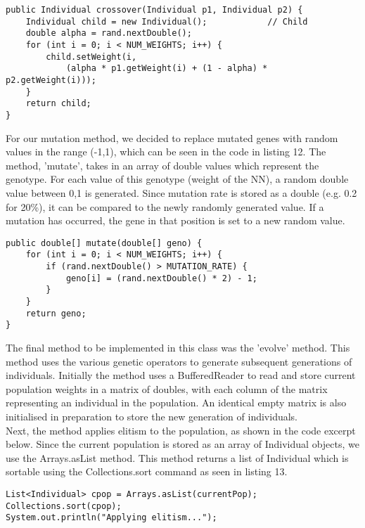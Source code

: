 \documentclass[12pt,a4paper]{article}
\begin{document}
\singlespacing
\begin{lstlisting}[caption=Weight based crossover implementation]
public Individual crossover(Individual p1, Individual p2) {
	Individual child = new Individual();            // Child
	double alpha = rand.nextDouble();
	for (int i = 0; i < NUM_WEIGHTS; i++) {
		child.setWeight(i,
			(alpha * p1.getWeight(i) + (1 - alpha) * p2.getWeight(i)));
	}
	return child;
}
\end{lstlisting}
\onehalfspace

\newpage
For our mutation method, we decided to replace mutated genes with random values in the range (-1,1), which can be seen in the code in listing 12. The method, 'mutate', takes in an array of double values which represent the genotype. For each value of this genotype (weight of the NN), a random double value between 0,1 is generated. Since mutation rate is stored as a double (e.g. 0.2 for 20\%), it can be compared to the newly randomly generated value. If a mutation has occurred, the gene in that position is set to a new random value.

\singlespacing
\begin{lstlisting}[caption=Code for mutation genetic operator in GeneticAlgorithm class]
public double[] mutate(double[] geno) {
	for (int i = 0; i < NUM_WEIGHTS; i++) {
		if (rand.nextDouble() > MUTATION_RATE) {
			geno[i] = (rand.nextDouble() * 2) - 1;
		}
	}
	return geno;
}
\end{lstlisting}
\onehalfspace
\vspace{7mm}

The final method to be implemented in this class was the 'evolve' method. This method uses the various genetic operators to generate subsequent generations of individuals. Initially the method uses a BufferedReader to read and store current population weights in a matrix of doubles, with each column of the matrix representing an individual in the population. An identical empty matrix is also initialised in preparation to store the new generation of individuals.\\

Next, the method applies elitism to the population, as shown in the code excerpt below. Since the current population is stored as an array of Individual objects, we use the Arrays.asList method. This method returns a list of Individual which is sortable using the Collections.sort command as seen in listing 13.

\singlespacing
\begin{lstlisting}[caption=Code excerpt for sorting array]
List<Individual> cpop = Arrays.asList(currentPop);
Collections.sort(cpop);
System.out.println("Applying elitism...");
\end{lstlisting}
\onehalfspace
\end{document}
